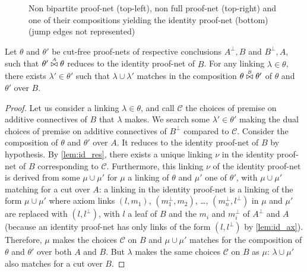 \documentclass{lmcs}
\newcommand*{\orth}{^\perp} %
\newenvironment{myscopec}[1]{
\begin{scope}[every node/.style={circle,thick,draw=#1,minimum size=8mm,inner sep=0}, every edge/.style={->,draw=#1,thick}, every path/.style={draw=#1, thick}]
\color{#1}
}{
\end{scope}
}
\newcommand{\symboltext}[2]{\mathrel{\overset{\makebox[0pt]{\mbox{\normalfont\tiny\sffamily \ensuremath{#1}}}}{#2}}} %
\newcommand*{\cutf}[3]{\ensuremath{#1\symboltext{#3}{\bowtie} #2}}
\begin{document}
\begin{figure}
\begin{adjustbox}{}
\end{adjustbox}
\caption{Non bipartite proof-net (top-left), non full proof-net (top-right) and one of their compositions yielding the identity proof-net (bottom) (jump edges not represented)}
\label{fig:no_anticut}
\end{figure}

\begin{lem}
\label{lem:id_match}
Let $\theta$ and $\theta'$ be cut-free proof-nets of respective conclusions $A\orth,B$ and $B\orth,A$, such that $\cutf{\theta'}{\theta}{A}$ reduces to the identity proof-net of $B$.
For any linking $\lambda\in\theta$, there exists $\lambda'\in\theta'$ such that $\lambda\cup\lambda'$ matches in the composition $\cutf{\theta}{\theta'}{B}$ of $\theta$ and $\theta'$ over $B$.
\end{lem}
\begin{proof}
Let us consider a linking $\lambda\in\theta$, and call $\mathcal{C}$ the choices of premise on additive connectives of $B$ that $\lambda$ makes.
We search some $\lambda'\in\theta'$ making the dual choices of premise on additive connectives of $B\orth$ compared to $\mathcal{C}$.
Consider the composition of $\theta$ and $\theta'$ over $A$.
It reduces to the identity proof-net of $B$ by hypothesis.
By \autoref{lem:id_res}, there exists a unique linking $\nu$ in the identity proof-net of $B$ corresponding to $\mathcal{C}$.
Furthermore, this linking $\nu$ of the identity proof-net is derived from some $\mu\cup\mu'$ for $\mu$ a linking of $\theta$ and $\mu'$ one of $\theta'$, with $\mu\cup\mu'$ matching for a cut over $A$: a linking in the identity proof-net is a linking of the form $\mu\cup\mu'$ where axiom links $(l,m_1)$, $(m_1\orth, m_2)$, \dots, $(m_n\orth, l\orth)$ in $\mu$ and $\mu'$ are replaced with $(l,l\orth)$, with $l$ a leaf of $B$ and the $m_i$ and $m_i\orth$ of $A\orth$ and $A$ (because an identity proof-net has only links of the form $(l,l\orth)$ by \autoref{lem:id_ax}).
Therefore, $\mu$ makes the choices $\mathcal{C}$ on $B$ and $\mu\cup\mu'$ matches for the composition of $\theta$ and $\theta'$ over both $A$ and $B$.
But $\lambda$ makes the same choices $\mathcal{C}$ on $B$ as $\mu$: $\lambda\cup\mu'$ also matches for a cut over $B$.
\end{proof}
\end{document}
